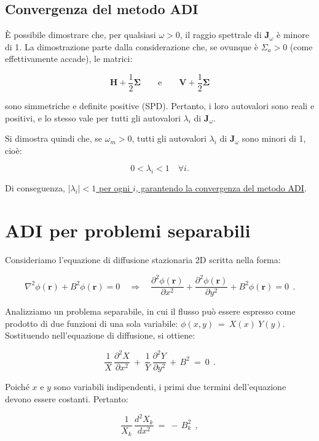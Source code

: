 %
%
%
\subsection{Convergenza del metodo ADI}

È possibile dimostrare che, per qualsiasi \(\omega > 0\), il raggio spettrale di \(\mathbf{J}_{\omega}\) è minore di 1.
La dimostrazione parte dalla considerazione che, se ovunque è \(\Sigma_a > 0\) (come effettivamente accade), le matrici:

\[
\mathbf{H} + \frac{1}{2} \mathbf{\Sigma} \qquad \text{e} \qquad \mathbf{V} + \frac{1}{2} \mathbf{\Sigma}
\]

sono simmetriche e definite positive (SPD). Pertanto, i loro autovalori sono reali e positivi, e lo stesso vale per tutti gli autovalori \(\lambda_i\) di \(\mathbf{J}_{\omega}\).

Si dimostra quindi che, se \(\omega_m > 0\), tutti gli autovalori \(\lambda_i\) di \(\mathbf{J}_{\omega}\) sono minori di 1, cioè:

\[
0 < \lambda_i < 1 \quad \forall i.
\]

Di conseguenza, \underline{\(\left| \lambda_i \right| < 1\) per ogni \(i\), garantendo la convergenza del metodo ADI}.

%
%
\section{ADI per problemi separabili}

Consideriamo l'equazione di diffusione stazionaria 2D scritta nella forma:

\[
\nabla^2 \phi(\mathbf{r}) + B^2 \phi(\mathbf{r}) = 0 
\quad \Rightarrow \quad 
\frac{\partial^2 \phi(\mathbf{r})}{\partial x^2} + \frac{\partial^2 \phi(\mathbf{r})}{\partial y^2} + B^2 \phi(\mathbf{r}) = 0\ \ . 
\]

Analizziamo un problema separabile, in cui il flusso può essere espresso come prodotto di due funzioni di una sola variabile: $\phi(x, y)\ =\ X(x)\ Y(y)$. Sostituendo nell'equazione di diffusione, si ottiene:

\[
\frac{1}{X}\, \frac{\partial^2 X}{\partial x^2}\ +\ \frac{1}{Y}\, \frac{\partial^2 Y}{\partial y^2}\, +\, B^2\ =\ 0\ \ .
\]

Poiché \(x\) e \(y\) sono variabili indipendenti, i primi due termini dell'equazione devono essere costanti. Pertanto:

\[
\frac{1}{X_k}\, \frac{d^2 X_k}{dx^2}\ =\ -\,B_k^2\ \ , 
\]

